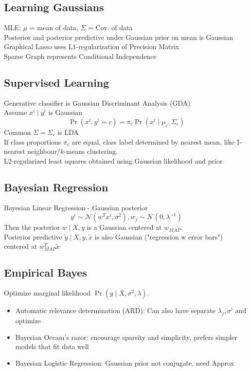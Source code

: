 \subsection*{Learning Gaussians}
MLE: $\mu$ = mean of data, $\Sigma$ = Cov. of data\\
Posterior and posterior predictive under Gaussian prior on mean is Gaussian\\
Graphical Lasso uses L1-regularization of Precision Matrix\\
Sparse Graph represents Conditional Independence
\subsection*{Supervised Learning}
Generative classifier is Gaussian Discriminant Analysis (GDA)\\
Assume $x^i\mid y^i$ is Gaussian
\[\Pr(x^i,y^i=c)=\pi_c\Pr(x^i\mid \mu_c,\Sigma_c)\]
Common $\Sigma=\Sigma_c$ is LDA\\
If class proportions $\pi_c$ are equal, class label determined by nearest mean,
like \"1-nearest neighbour\"/$k$-means clustering.\\
L2-regularized least squares obtained using Gaussian likelihood and prior
\subsection*{Bayesian Regression}
Bayesian Linear Regression - Gaussian posterior\\
\[y^i\sim\mathcal{N}(w^T x^i,\sigma^2), w_j\sim\mathcal{N}(0,\lambda^{-1})\]
Then the posterior $w\mid X,y$ is a Gaussian centered at $w_{MAP}$.\\
Posterior predictive $\tilde{y}\mid X,y,\tilde{x}$ 
is also Gaussian ("regression w error bars") centered at $w_{MAP}^T \tilde{x}$\\
\subsection*{Empirical Bayes}
Optimize marginal likelihood $\Pr(y\mid X,\sigma^2,\lambda)$.
\begin{itemize}
    \item Automatic relevance determination (ARD): 
    Can also have separate $\lambda_j,\sigma^i$ and optimize
    \item Bayesian Occam's razor: encourage sparsity and simplicity, 
    prefers simpler models that fit data well
    \item Bayesian Logistic Regression: Gaussian prior not conjugate, need Approx
\end{itemize}

